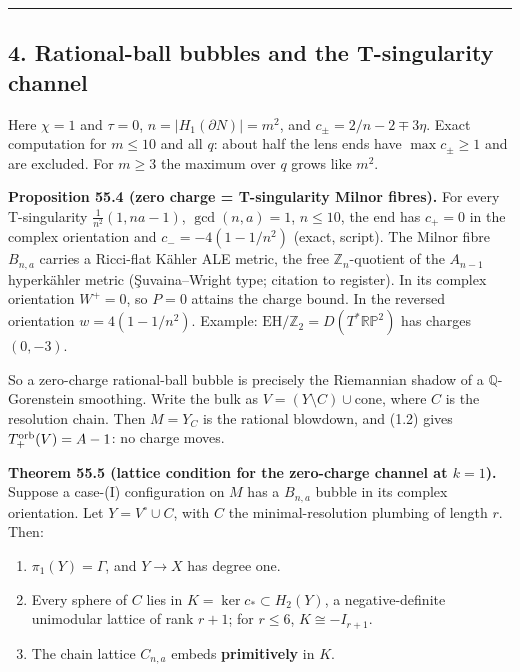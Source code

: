 \documentclass[
  10pt,
]{report}
\renewcommand{\backslash}{\mathord{\text{\textbackslash}}}%
\renewcommand{\setminus}{\mathbin{\backslash}}}
\begin{document}
\begin{center}\rule{0.5\linewidth}{0.5pt}\end{center}

\hypertarget{rational-ball-bubbles-and-the-t-singularity-channel}{%
\subsection{4. Rational-ball bubbles and the T-singularity
channel}\label{rational-ball-bubbles-and-the-t-singularity-channel}}

Here \(\chi=1\) and \(\tau=0\), \(n=|H_1(\partial N)|=m^2\), and
\(c_\pm=2/n-2\mp3\eta\). Exact computation for \(m\le10\) and all \(q\):
about half the lens ends have \(\max c_\pm\ge1\) and are excluded. For
\(m\ge3\) the maximum over \(q\) grows like \(m^2\).

\textbf{Proposition 55.4 (zero charge = T-singularity Milnor fibres).}
For every T-singularity \(\tfrac1{n^2}(1,na-1)\), \(\gcd(n,a)=1\),
\(n\le10\), the end has \(c_+=0\) in the complex orientation and
\(c_-=-4(1-1/n^2)\) (exact, script). The Milnor fibre \(B_{n,a}\)
carries a Ricci-flat Kähler ALE metric, the free
\(\mathbb Z_n\)-quotient of the \(A_{n-1}\) hyperkähler metric
(Şuvaina--Wright type; citation to register). In its complex orientation
\(W^+=0\), so \(P=0\) attains the charge bound. In the reversed
orientation \(w=4(1-1/n^2)\). Example:
\(\mathrm{EH}/\mathbb Z_2=D(T^*\mathbb{RP}^2)\) has charges \((0,-3)\).

So a zero-charge rational-ball bubble is precisely the Riemannian shadow
of a \(\mathbb Q\)-Gorenstein smoothing. Write the bulk as
\(V=(Y\setminus C)\cup\mathrm{cone}\), where \(C\) is the resolution
chain. Then \(M=Y_C\) is the rational blowdown, and (1.2) gives
\(T_+^{\rm orb}(V)=A-1\): no charge moves.

\textbf{Theorem 55.5 (lattice condition for the zero-charge channel at
\(k=1\)).} Suppose a case-(I) configuration on \(M\) has a \(B_{n,a}\)
bubble in its complex orientation. Let \(Y=V^\circ\cup C\), with \(C\)
the minimal-resolution plumbing of length \(r\). Then:

\begin{enumerate}
\def\labelenumi{(\roman{enumi})}
\item
  \(\pi_1(Y)=\Gamma\), and \(Y\to X\) has degree one.
\item
  Every sphere of \(C\) lies in \(K=\ker c_*\subset H_2(Y)\), a
  negative-definite unimodular lattice of rank \(r+1\); for \(r\le6\),
  \(K\cong-I_{r+1}\).
\item
  The chain lattice \(C_{n,a}\) embeds \textbf{primitively} in \(K\).
\end{enumerate}
\end{document}
